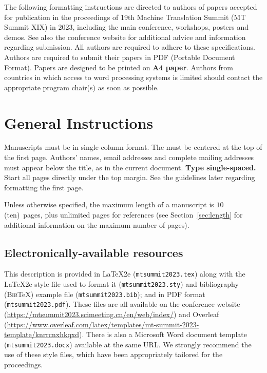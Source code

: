 \documentclass[]{article}
\newcommand{\conffilename}{mtsummit2023}
\newcommand{\downloadsite}{\protect\url{https://mtsummit2023.scimeeting.cn/en/web/index/}}
\newcommand{\overleaftemplate}
{\protect\url{https://www.overleaf.com/latex/templates/mt-summit-2023-template/knrrcnxhkqxd}}
\newcommand{\paperlength}{$10$ (ten)}
\newcommand{\shortpaperlength}{$6$ (six)}
\begin{document}
The following formatting instructions are directed to authors of papers accepted
for publication in the proceedings of 19th Machine Translation Summit (MT Summit XIX) in 2023,
including the main conference, workshops, posters and demos.
See also the conference website for additional advice and information regarding submission.
All authors are required to adhere to these specifications.
Authors are required to submit their papers in PDF (Portable Document Format).
Papers are designed to be printed on \textbf{A4 paper}.
Authors from countries in which access to word processing systems is limited
should contact the appropriate program chair(s) as soon as possible.

\section{General Instructions}

Manuscripts must be in single-column format. The {}
must be centered at the top of the first page. Authors' names, email
addresses and complete mailing addresses must appear below the title,
as in the current document. {\bf Type single-spaced.}  Start all pages
directly under the top margin. See the guidelines later regarding
formatting the first page.

Unless otherwise specified, the maximum length of a manuscript is
\paperlength~pages, plus unlimited pages for references
(see Section~\ref{sec:length} for additional information on the
maximum number of pages).

\subsection{Electronically-available resources}

This description is provided in \LaTeX2e (\nobreak\texttt{\conffilename.tex})
along with the \LaTeX2e style file used to format it
(\nobreak\texttt{\conffilename.sty}) and bibliography
(\textsc{Bib}\TeX) example file (\nobreak\texttt{\conffilename.bib}); and in
PDF format (\nobreak\texttt{\conffilename.pdf}).
These files are all
available on the conference website (\downloadsite)
and Overleaf (\overleaftemplate).
There is also a Microsoft Word document
template (\nobreak\texttt{\conffilename.docx}) available at the same URL. We
strongly re\-commend the use of these style files, which have been
appropriately tailored for the proceedings.
\end{document}
